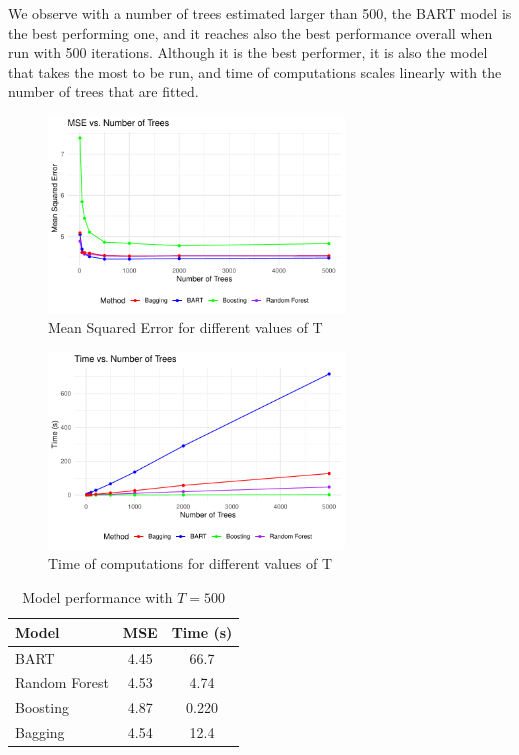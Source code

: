 \documentclass[a4paper,11pt]{article}
\begin{document}
We observe with a number of trees estimated larger than 500, the BART model is the best performing one, and it reaches also the best performance overall when run with 500 iterations. Although it is the best performer, it is also the model that takes the most to be run, and time of computations scales linearly with the number of trees that are fitted.

\begin{figure}
  \centering
  \includegraphics[width=0.7\textwidth]{outputs/mse_plot.pdf}
  \caption{Mean Squared Error for different values of T}
  \label{plot_mse}
\end{figure}

\begin{figure}
  \centering
  \includegraphics[width=0.7\textwidth]{outputs/time_plot.pdf}
  \caption{Time of computations for different values of T}
  \label{plot_time}
\end{figure}

\begin{table}[ht]
  \centering
  \begin{tabular}{lcc}
  \toprule
  Model           & MSE & Time (s) \\
  \midrule
  BART            & 4.45    & 66.7  \\
  Random Forest   & 4.53    & 4.74  \\
  Boosting        & 4.87    & 0.220 \\
  Bagging         & 4.54    & 12.4  \\
  \bottomrule
  \end{tabular}
  \caption{Model performance with $T=500$}
  \end{table}



\newpage
$ $
\newpage

\printbibliography
\end{document}
